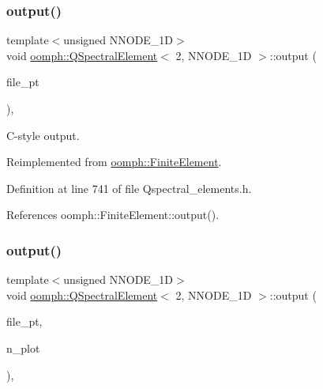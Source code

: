 \subsubsection{\texorpdfstring{output()}{output()}\hspace{0.1cm}{\footnotesize\ttfamily [1/4]}}
{\footnotesize\ttfamily template$<$unsigned N\+N\+O\+D\+E\+\_\+1D$>$ \\
void \hyperlink{classoomph_1_1QSpectralElement}{oomph\+::\+Q\+Spectral\+Element}$<$ 2, N\+N\+O\+D\+E\+\_\+1D $>$\+::output (\begin{DoxyParamCaption}\item[{F\+I\+LE $\ast$}]{file\+\_\+pt }\end{DoxyParamCaption})\hspace{0.3cm}{\ttfamily [inline]}, {\ttfamily [virtual]}}



C-\/style output. 



Reimplemented from \hyperlink{classoomph_1_1FiniteElement_a72cddd09f8ddbee1a20a1ff404c6943e}{oomph\+::\+Finite\+Element}.



Definition at line 741 of file Qspectral\+\_\+elements.\+h.



References oomph\+::\+Finite\+Element\+::output().

\mbox{\label{classoomph_1_1QSpectralElement_3_012_00_01NNODE__1D_01_4_a129604057f0fc189c83421d96988eb41}} 
\subsubsection{\texorpdfstring{output()}{output()}\hspace{0.1cm}{\footnotesize\ttfamily [2/4]}}
{\footnotesize\ttfamily template$<$unsigned N\+N\+O\+D\+E\+\_\+1D$>$ \\
void \hyperlink{classoomph_1_1QSpectralElement}{oomph\+::\+Q\+Spectral\+Element}$<$ 2, N\+N\+O\+D\+E\+\_\+1D $>$\+::output (\begin{DoxyParamCaption}\item[{F\+I\+LE $\ast$}]{file\+\_\+pt,  }\item[{const unsigned \&}]{n\+\_\+plot }\end{DoxyParamCaption})\hspace{0.3cm}{\ttfamily [inline]}, {\ttfamily [virtual]}}



